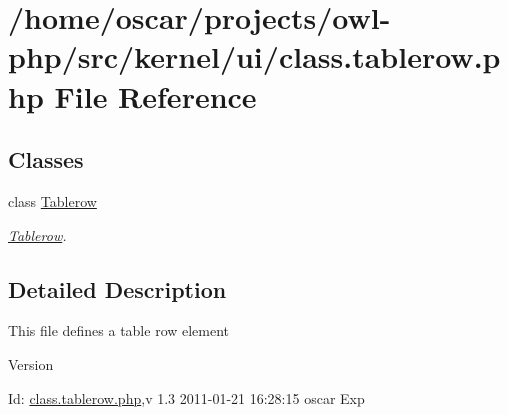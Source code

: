 \section{/home/oscar/projects/owl-\/php/src/kernel/ui/class.tablerow.php File Reference}
\label{class_8tablerow_8php}
\subsection*{Classes}
\begin{DoxyCompactItemize}
\item 
class \hyperlink{classTablerow}{Tablerow}
\begin{DoxyCompactList}\small\item\em \hyperlink{classTablerow}{Tablerow}. \item\end{DoxyCompactList}\end{DoxyCompactItemize}


\subsection{Detailed Description}
This file defines a table row element \begin{DoxyVersion}{Version}

\end{DoxyVersion}
\begin{DoxyParagraph}{Id:}
\hyperlink{class_8tablerow_8php}{class.tablerow.php},v 1.3 2011-\/01-\/21 16:28:15 oscar Exp 
\end{DoxyParagraph}
